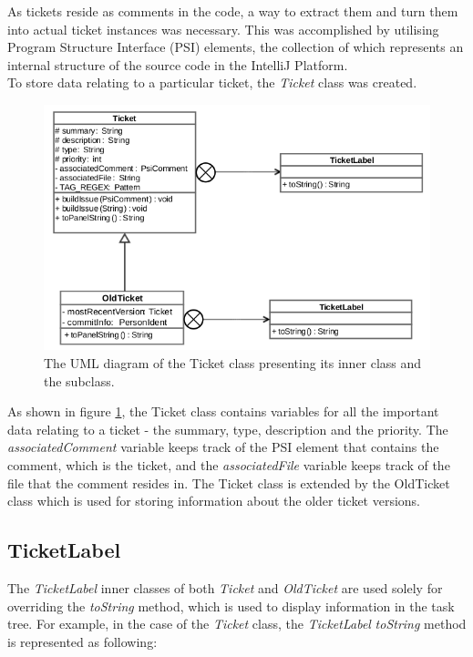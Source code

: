 \documentclass{4thYearProject}
\begin{document}
As tickets reside as comments in the code, a way to extract them and turn them into actual ticket instances was necessary. This was accomplished by utilising Program Structure Interface (PSI) elements, the collection of which represents an internal structure of the source code in the IntelliJ Platform. \\

To store data relating to a particular ticket, the \textit{Ticket} class was created.

\begin{figure}[H]
\includegraphics[scale=0.6]{Ticket_UML}
\centering
\caption{The UML diagram of the Ticket class presenting its inner class and the subclass.}
\label{fig:ticketuml}
\end{figure}

As shown in figure \ref{fig:ticketuml}, the Ticket class contains variables for all the important data relating to a ticket - the summary, type, description and the priority. The \textit{associatedComment} variable keeps track of the PSI element that contains the comment, which is the ticket, and the \textit{associatedFile} variable keeps track of the file that the comment resides in. The Ticket class is extended by the OldTicket class which is used for storing information about the older ticket versions. 

\subsection{TicketLabel}

The \textit{TicketLabel} inner classes of both \textit{Ticket} and \textit{OldTicket} are used solely for overriding the \textit{toString} method, which is used to display information in the task tree. For example, in the case of the \textit{Ticket} class, the \textit{TicketLabel} \textit{toString} method is represented as following:
\end{document}
